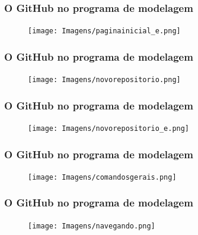 \documentclass[10pt]{beamer} %
\begin{document}
\begin{frame}
\frametitle{O GitHub no programa de modelagem}

\begin{block}{}
\begin{figure}[H]
\centering
\texttt{[image: Imagens/paginainicial\_e.png]}
\end{figure}

\end{block}
\end{frame}

\begin{frame}
\frametitle{O GitHub no programa de modelagem}

\begin{block}{}
\begin{figure}[H]
\centering
\texttt{[image: Imagens/novorepositorio.png]}
\end{figure}

\end{block}
\end{frame}

\begin{frame}
\frametitle{O GitHub no programa de modelagem}

\begin{block}{}
\begin{figure}[H]
\centering
\texttt{[image: Imagens/novorepositorio\_e.png]}
\end{figure}

\end{block}
\end{frame}


\begin{frame}
\frametitle{O GitHub no programa de modelagem}

\begin{block}{}
\begin{figure}[H]
\centering
\texttt{[image: Imagens/comandosgerais.png]}
\end{figure}

\end{block}
\end{frame}

\begin{frame}
\frametitle{O GitHub no programa de modelagem}

\begin{block}{}
\begin{figure}[H]
\centering
\texttt{[image: Imagens/navegando.png]}
\end{figure}

\end{block}
\end{frame}
\end{document}
